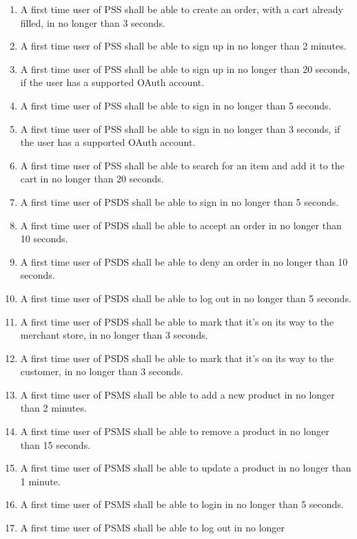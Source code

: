 \begin{enumerate}[label=USE-\arabic*]
    \item A first time user of PSS shall be able to create an order, with a 
    cart already filled, in no longer than 3 seconds.
    \item A first time user of PSS shall be able to sign up in no longer 
    than 2 minutes.
    \item A first time user of PSS shall be able to sign up in no longer 
    than 20 seconds, if the user has a supported OAuth account.
    \item A first time user of PSS shall be able to sign in no longer 
    than 5 seconds.
    \item A first time user of PSS shall be able to sign in no longer 
    than 3 seconds, if the user has a supported OAuth account.
    \item A first time user of PSS shall be able to search for an item and 
    add it to the cart in no longer than 20 seconds.
    \item A first time user of PSDS shall be able to sign in no longer 
    than 5 seconds.
    \item A first time user of PSDS shall be able to accept an order in no 
    longer than 10 seconds.
    \item A first time user of PSDS shall be able to deny an order in no 
    longer than 10 seconds.
    \item A first time user of PSDS shall be able to log out in no longer 
    than 5 seconds.
    \item A first time user of PSDS shall be able to mark that it’s on its 
    way to the merchant store, in no longer than 3 seconds.
    \item A first time user of PSDS shall be able to mark that it’s on its 
    way to the customer, in no longer than 3 seconds.
    \item A first time user of PSMS shall be able to add a new product in 
    no longer than 2 minutes.
    \item A first time user of PSMS shall be able to remove a product in 
    no longer than 15 seconds.
    \item A first time user of PSMS shall be able to update a product in 
    no longer than 1 minute.
    \item A first time user of PSMS shall be able to login in no longer 
    than 5 seconds.
    \item A first time user of PSMS shall be able to log out in no longer 

\end{enumerate}
